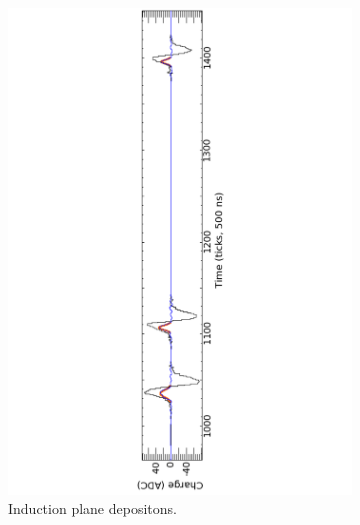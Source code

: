 \begin{figure}[h]
\begin{subfigure}{0.95\textwidth}
    \includegraphics[width=\textwidth]{InductionPlane}
    \caption{Induction plane depositons.}
    \label{fig:LotsOfHits_Ind}
  \end{subfigure}
  \begin{subfigure}{0.95\textwidth}
    \centering

\end{subfigure}
\end{figure}

